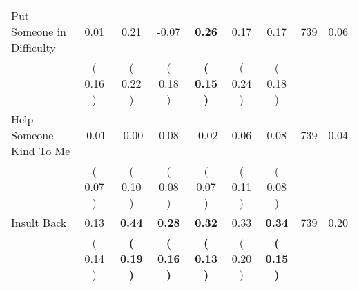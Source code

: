 \begin{tabular}{lcccccccc}
Put Someone in Difficulty &      0.01 &      0.21 &     -0.07 & \textbf{     0.26} &      0.17 &      0.17 & 739 &       0.06 \\ 
 & (     0.16 ) & (     0.22 ) & (     0.18 ) & \textbf{(     0.15 )} & (     0.24 ) & (     0.18 ) & \\
Help Someone Kind To Me &     -0.01 &     -0.00 &      0.08 &     -0.02 &      0.06 &      0.08 & 739 &       0.04 \\ 
 & (     0.07 ) & (     0.10 ) & (     0.08 ) & (     0.07 ) & (     0.11 ) & (     0.08 ) & \\
Insult Back &      0.13 & \textbf{     0.44} & \textbf{     0.28} & \textbf{     0.32} &      0.33 & \textbf{     0.34} & 739 &       0.20 \\ 
 & (     0.14 ) & \textbf{(     0.19 )} & \textbf{(     0.16 )} & \textbf{(     0.13 )} & (     0.20 ) & \textbf{(     0.15 )} & \\
\bottomrule
\end{tabular}
